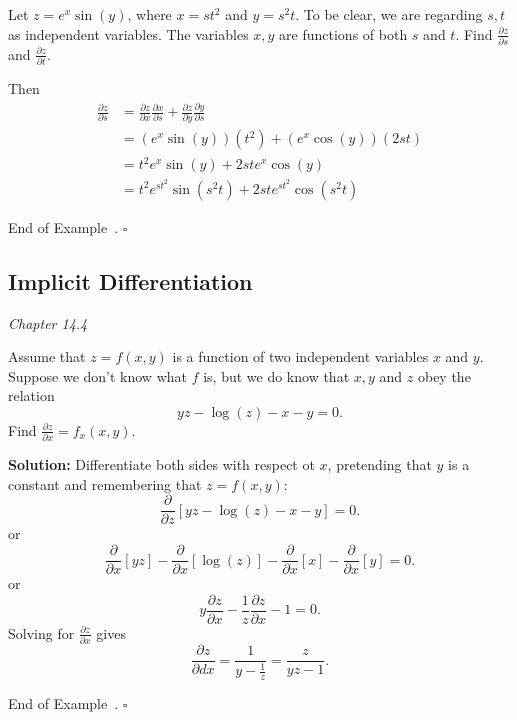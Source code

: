 \documentclass[10pt]{article}
\theoremstyle{definition}
\newtheorem{example}[theorem]{Example}
\renewenvironment{example}
{\begin{oldexample}}
  {\par\smallskip\hfill   End of Example~\theexample. $\square$    \par\end{oldexample}}
\newcommand{\fl}{\noindent\textbf} %
\newcommand{\1}[1]{\textbf{1}_{\left[#1\right]}} %
\begin{document}
\begin{example}
  Let $z=e^{x}\sin(y)$, where $x=st^{2}$ and $y=s^{2}t$. To be clear, we are
  regarding $s,t$ as independent variables. The variables $x,y$ are functions of
  both $s$ and $t$. Find $\frac{\partial
    z}{\partial s}$ and $\frac{\partial z}{\partial t}$.

  Then
  \begin{align*}
    \frac{\partial z}{\partial s} 
    &= \frac{\partial z}{\partial x} \frac{\partial x}{\partial s}+ \frac{\partial z}{\partial y}\frac{\partial y}{\partial s}\\
    &= \left( e^{x}\sin(y) \right) \left( t^{2} \right)+ \left( e^{x}\cos(y) \right) \left( 2st \right)\\    
    &= t^{2}e^{x}\sin(y)+ 2ste^{x}\cos(y)\\
    &= t^{2}e^{st^{2}}\sin(s^{2}t)+2st e^{st^{2}}\cos(s^{2}t)
  \end{align*}
  
\end{example}


\subsection{Implicit Differentiation}
\textit{Chapter 14.4}
\begin{example}
  Assume that $z=f(x,y)$ is a function of two independent variables $x$ and
  $y$. Suppose we don't know what $f$ is, but we do know that $x,y$ and $z$
  obey the relation
  \begin{equation*}
    yz - \log(z) - x - y = 0.
  \end{equation*}
  Find $\frac{\partial z}{\partial x} = f_{x}(x,y)$.

  \fl{Solution:} Differentiate both sides with respect ot $x$, pretending that
  $y$ is a constant and remembering that $z=f(x,y)$:
  \begin{equation*}
    \frac{\partial }{\partial z}\left[ yz - \log(z) - x - y  \right] =0.
  \end{equation*}
  or
  \begin{equation*}
    \frac{\partial }{\partial x}\left[ yz  \right]  - \frac{\partial }{\partial x}\left[ \log(z) \right]  - \frac{\partial }{\partial x}\left[ x \right]  - \frac{\partial }{\partial x}\left[ y \right]  =0.
  \end{equation*}
  or
  \begin{equation*}
    y\frac{\partial z}{\partial x}  - \frac{1}{z}\frac{\partial z}{\partial x}  - 1=0.
  \end{equation*}
  Solving for $\frac{\partial z}{\partial x}$ gives
  \begin{equation*}
    \frac{\partial z}{\partial dx} = \frac{1}{y-\frac{1}{z}} = \frac{z}{yz-1}.
  \end{equation*}
\end{example}
\end{document}
